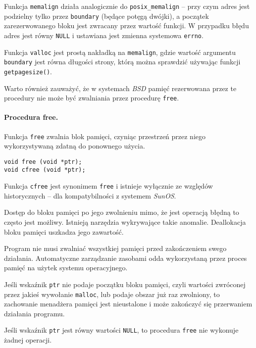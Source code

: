\documentclass[12pt,a4paper,titlepage,twoside]{mwart}
\begin{document}
Funkcja \texttt{memalign} działa analogicznie do \texttt{posix\_memalign} --
przy czym adres jest podzielny tylko przez \texttt{boundary} (będące potęgą
dwójki), a początek zarezerwowanego bloku jest zwracany przez wartość funkcji.
W przypadku błędu adres jest równy \texttt{NULL} i ustawiana jest zmienna
systemowa \texttt{errno}.

Funkcja \texttt{valloc} jest prostą nakładką na \texttt{memalign}, gdzie
wartość argumentu \texttt{boundary} jest równa długości strony, którą można
sprawdzić używając funkcji \texttt{getpagesize()}.

Warto również zauważyć, że w systemach \textit{BSD} pamięć rezerwowana przez te
procedury nie może być zwalniania przez procedurę \texttt{free}.

\paragraph{Procedura free.}

Funkcja \texttt{free} zwalnia blok pamięci, czyniąc przestrzeń przez niego
wykorzystywaną zdatną do ponownego użycia.

\vspace{2ex}
\begin{lstlisting}[caption={Prototyp procedury \texttt{free} i \texttt{cfree}.}]
void free (void *ptr);
void cfree (void *ptr);
\end{lstlisting}

Funkcja \texttt{cfree} jest synonimem \texttt{free} i istnieje wyłącznie ze
względów historycznych -- dla kompatybilności z systemem \textit{SunOS}.

Dostęp do bloku pamięci po jego zwolnieniu mimo, że jest operacją błędną to
często jest możliwy. Istnieją narzędzia wykrywające takie anomalie. Deallokacja
bloku pamięci uszkadza jego zawartość.

Program nie musi zwalniać wszystkiej pamięci przed zakończeniem swego
działania. Automatyczne zarządzanie zasobami odda wykorzystaną przez proces
pamięć na użytek systemu operacyjnego.

Jeśli wskaźnik \texttt{ptr} nie podaje początku bloku pamięci, czyli wartości
zwróconej przez jakieś wywołanie \texttt{malloc}, lub podaje obszar już raz
zwolniony, to zachowanie menadżera pamięci jest nieustalone i może
zakończyć się przerwaniem działania programu.

Jeśli wskaźnik \texttt{ptr} jest równy wartości \texttt{NULL}, to procedura
\texttt{free} nie wykonuje żadnej operacji.
\end{document}
